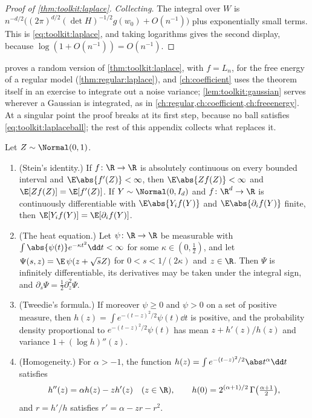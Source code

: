 \begin{refsection}
\begin{proof}[Proof of \cref{thm:toolkit:laplace}]
\emph{Collecting.} The integral over $W$ is $n^{-d/2}\bigl((2\pi)^{d/2}(\det H)^{-1/2}g(w_0)+O(n^{-1})\bigr)$ plus exponentially small terms. This is \eqref{eq:toolkit:laplace}, and taking logarithms gives the second display, because $\log(1+O(n^{-1}))=O(n^{-1})$.
\end{proof}

 proves a random version of \cref{thm:toolkit:laplace}, with $f=L_n$, for the free energy of a regular model (\cref{thm:regular:laplace}), and \cref{ch:coefficient} uses the theorem itself in an exercise to integrate out a noise variance; \cref{lem:toolkit:gaussian} serves wherever a Gaussian is integrated, as in \cref{ch:regular,ch:coefficient,ch:freeenergy}. At a singular point the proof breaks at its first step, because no ball satisfies \eqref{eq:toolkit:laplaceball}; the rest of this appendix collects what replaces it.

\begin{theorem}\label{thm:toolkit:stein}
Let $Z\sim\Normal(0,1)$.
\begin{enumerate}
\item (Stein's identity.) If $f\colon\R\to\R$ is absolutely continuous on every bounded interval and $\E\abs{f'(Z)}<\infty$, then $\E\abs{Zf(Z)}<\infty$ and $\E[Zf(Z)]=\E[f'(Z)]$. If $Y\sim\Normal(0,I_d)$ and $f\colon\R^d\to\R$ is continuously differentiable with $\E\abs{Y_if(Y)}$ and $\E\abs{\partial_if(Y)}$ finite, then $\E[Y_if(Y)]=\E[\partial_if(Y)]$.
\item (The heat equation.) Let $\psi\colon\R\to\R$ be measurable with $\int\abs{\psi(t)}e^{-\kappa t^2}\dd t<\infty$ for some $\kappa\in(0,\frac12)$, and let $\Psi(s,z)=\E\,\psi(z+\sqrt sZ)$ for $0<s<1/(2\kappa)$ and $z\in\R$. Then $\Psi$ is infinitely differentiable, its derivatives may be taken under the integral sign, and $\partial_s\Psi=\frac12\partial_z^2\Psi$.
\item (Tweedie's formula.) If moreover $\psi\ge0$ and $\psi>0$ on a set of positive measure, then $h(z)=\int e^{-(t-z)^2/2}\psi(t)\dd t$ is positive, and the probability density proportional to $e^{-(t-z)^2/2}\psi(t)$ has mean $z+h'(z)/h(z)$ and variance $1+(\log h)''(z)$.
\item (Homogeneity.) For $\alpha>-1$, the function $h(z)=\int e^{-(t-z)^2/2}\abs t^\alpha\dd t$ satisfies
\begin{equation}\label{eq:toolkit:homogeneity}
h''(z)=\alpha h(z)-zh'(z)\quad(z\in\R),\qquad h(0)=2^{(\alpha+1)/2}\,\Gamma\bigl(\tfrac{\alpha+1}2\bigr),
\end{equation}
and $r=h'/h$ satisfies $r'=\alpha-zr-r^2$.
\end{enumerate}
\end{theorem}


\end{refsection}
